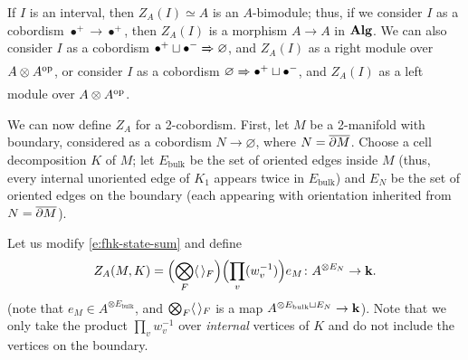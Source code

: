 If $I$ is an interval, then $Z_A(I)\simeq A$ is an $A$-bimodule; thus, if we
consider $I$ as a cobordism $\bullet^+\to \bullet^+$, then $Z_A(I)$ is a
morphism $A\to A$ in $\mathbf{Alg}$. We can also consider $I$ as a cobordism
$\bullet^+\sqcup\bullet^-\xRightarrow{}\varnothing$, and $Z_A(I)$ as a right module
over $A\otimes A^{\mathrm{op}}$, or consider $I$ as a cobordism
$\varnothing\xRightarrow{}\bullet^+\sqcup\bullet^-$, and $Z_A(I)$ as a left module over
$A\otimes A^{\mathrm{op}}$.


We can now define $Z_A$ for a 2-cobordism. First, let $M$ be a 2-manifold with
boundary, considered as a cobordism $N\to \varnothing$, where $N=\overline{\partial M}$.
Choose a cell decomposition $K$ of $M$; let $E_{\mathrm{bulk}}$ be the set of
oriented edges inside $M$ (thus, every internal unoriented edge of $K_1$
appears twice in $E_{\mathrm{bulk}}$) and $E_{N}$ be the set of oriented edges
on the boundary (each appearing with orientation inherited from $N=\overline{\partial
M}$).

Let us modify \eqref{e:fhk-state-sum} and define
\begin{equation}\label{e:fhk-state-sum2}
  Z_A(M,K)= \Bigl(\bigotimes_F \langle \, \rangle_F\Bigr)
  \Bigl(\prod_v(w^{-1}_v) \Bigr)e_M\colon A^{\otimes E_N}\to \mathbf{k}.
\end{equation}
(note that $e_M\in A^{\otimes E_{\mathrm{bulk}}}$, and $\bigotimes_F \langle \, \rangle_F$ is
a map $A^{\otimes E_{\mathrm{bulk}}\sqcup E_N}\to \mathbf{k}$). Note that we only take the
product $\prod_v w^{-1}_v$ over \emph{internal} vertices of $K$ and do
not include the vertices on the boundary.

